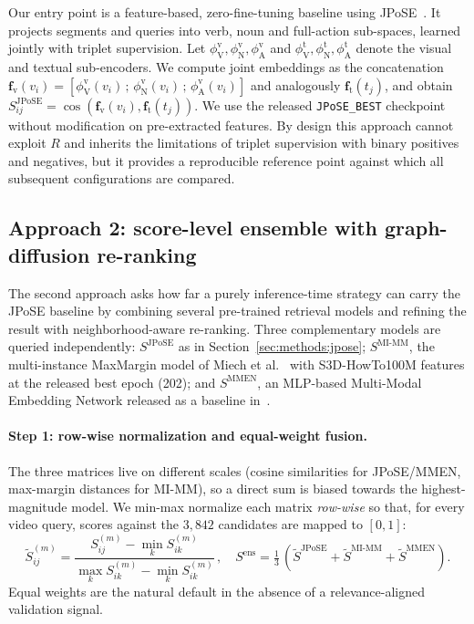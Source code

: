 Our entry point is a feature-based, zero-fine-tuning baseline using JPoSE~\cite{wray2019jpose}. It projects segments and queries into verb, noun and full-action sub-spaces, learned jointly with triplet supervision. Let $\phi^{\mathrm{v}}_{\mathrm{V}}, \phi^{\mathrm{v}}_{\mathrm{N}}, \phi^{\mathrm{v}}_{\mathrm{A}}$ and $\phi^{\mathrm{t}}_{\mathrm{V}}, \phi^{\mathrm{t}}_{\mathrm{N}}, \phi^{\mathrm{t}}_{\mathrm{A}}$ denote the visual and textual sub-encoders. We compute joint embeddings as the concatenation $\mathbf{f}_{\mathrm{v}}(v_i) = [\phi^{\mathrm{v}}_{\mathrm{V}}(v_i)\,;\,\phi^{\mathrm{v}}_{\mathrm{N}}(v_i)\,;\,\phi^{\mathrm{v}}_{\mathrm{A}}(v_i)]$ and analogously $\mathbf{f}_{\mathrm{t}}(t_j)$, and obtain $S^{\mathrm{JPoSE}}_{ij} = \cos(\mathbf{f}_{\mathrm{v}}(v_i), \mathbf{f}_{\mathrm{t}}(t_j))$. We use the released \texttt{JPoSE\_BEST} checkpoint without modification on pre-extracted features. By design this approach cannot exploit $R$ and inherits the limitations of triplet supervision with binary positives and negatives, but it provides a reproducible reference point against which all subsequent configurations are compared.

\subsection{Approach 2: score-level ensemble with graph-diffusion re-ranking}
\label{sec:methods:ensemble}

The second approach asks how far a purely inference-time strategy can carry the JPoSE baseline by combining several pre-trained retrieval models and refining the result with neighborhood-aware re-ranking. Three complementary models are queried independently: $S^{\mathrm{JPoSE}}$ as in Section~\ref{sec:methods:jpose}; $S^{\mathrm{MI\text{-}MM}}$, the multi-instance MaxMargin model of Miech et al.~\cite{miech2020milnce} with S3D-HowTo100M features at the released best epoch (202); and $S^{\mathrm{MMEN}}$, an MLP-based Multi-Modal Embedding Network released as a baseline in~\cite{wray2019jpose}.

\paragraph{Step 1: row-wise normalization and equal-weight fusion.}
The three matrices live on different scales (cosine similarities for JPoSE/MMEN, max-margin distances for MI-MM), so a direct sum is biased towards the highest-magnitude model. We min-max normalize each matrix \emph{row-wise} so that, for every video query, scores against the $3{,}842$ candidates are mapped to $[0,1]$:
\begin{equation}
\widetilde{S}^{(m)}_{ij} = \frac{S^{(m)}_{ij} - \min_k S^{(m)}_{ik}}{\max_k S^{(m)}_{ik} - \min_k S^{(m)}_{ik}}\,,\quad
S^{\mathrm{ens}} = \tfrac{1}{3}\,(\widetilde{S}^{\mathrm{JPoSE}} + \widetilde{S}^{\mathrm{MI\text{-}MM}} + \widetilde{S}^{\mathrm{MMEN}}).
\label{eq:ensemble}
\end{equation}
Equal weights are the natural default in the absence of a relevance-aligned validation signal.


